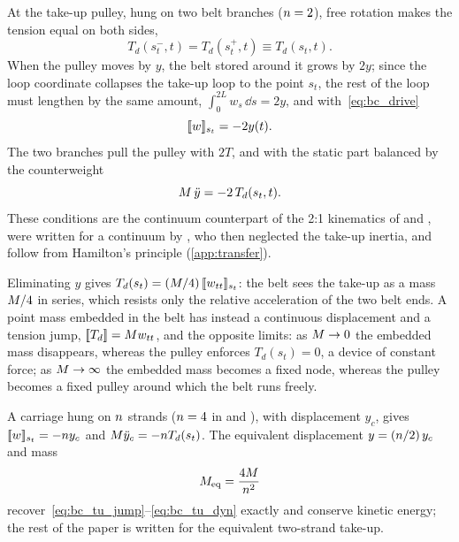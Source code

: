 At the take-up pulley, hung on two belt branches ($n=2$), free rotation makes the
tension equal on both sides,
\begin{equation}\label{eq:bc_tu_tension}
  T_d(s_t^-,t)=T_d(s_t^+,t)\equiv T_d(s_t,t).
\end{equation}
When the pulley moves by $y$, the belt stored around it grows by $2y$; since the loop
coordinate collapses the take-up loop to the point $s_t$, the rest of the loop must
lengthen by the same amount, $\int_0^{2L}w_s\,\dd s=2y$, and with~\eqref{eq:bc_drive}
\begin{equation}\label{eq:bc_tu_jump}
  [\![w]\!]_{s_t}=-2y(t).
\end{equation}
The two branches pull the pulley with $2T$, and with the static part balanced by the
counterweight
\begin{equation}\label{eq:bc_tu_dyn}
  M\,\ddot y=-2\,T_d(s_t,t).
\end{equation}
These conditions are the continuum counterpart of the 2:1 kinematics of
\citet[Eq.~7.55]{lodewijks1996} and \citet[Eqs.~4--5]{kulinowski2014}, were written for a
continuum by \citet[Eqs.~5--6]{song2012}, who then neglected the take-up inertia, and follow
from Hamilton's principle (\cref{app:transfer}).

Eliminating $y$ gives $T_d(s_t)=(M/4)\,[\![w_{tt}]\!]_{s_t}$: the belt sees the take-up as
a mass $M/4$ in series, which resists only the relative acceleration of the two belt
ends. A point mass embedded in the belt \citep{harrison1983,sakharwade2019} has instead a
continuous displacement and a tension jump, $[\![T_d]\!]=M w_{tt}$, and the opposite
limits: as $M\to0$ the embedded mass disappears, whereas the pulley enforces
$T_d(s_t)=0$, a device of constant force; as $M\to\infty$ the embedded mass becomes a
fixed node, whereas the pulley becomes a fixed pulley around which the belt runs freely.

A carriage hung on $n$ strands ($n=4$ in \citet{harrison1985b} and
\citet{nordell1997zisco}), with displacement $y_c$, gives $[\![w]\!]_{s_t}=-n y_c$ and
$M\ddot y_c=-n T_d(s_t)$. The equivalent displacement $y=(n/2)\,y_c$ and mass
\begin{equation}\label{eq:nmap}
  M_{\mathrm{eq}}=\frac{4M}{n^2}
\end{equation}
recover~\eqref{eq:bc_tu_jump}--\eqref{eq:bc_tu_dyn} exactly and conserve kinetic energy;
the rest of the paper is written for the equivalent two-strand take-up.

